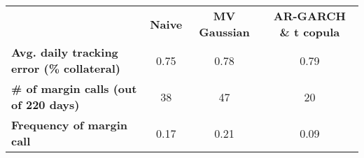 \begin{small}\begin{tabular}{ l c c c }
&\textbf{Naive}&\textbf{MV Gaussian}&\textbf{AR-GARCH \& t copula}\\
\textbf{Avg. daily tracking error (\% collateral)}&0.75&0.78&0.79\\
\textbf{\# of margin calls (out of 220 days)}&38&47&20\\
\textbf{Frequency of margin call}&0.17&0.21&0.09\\
\end{tabular}
\end{small}
